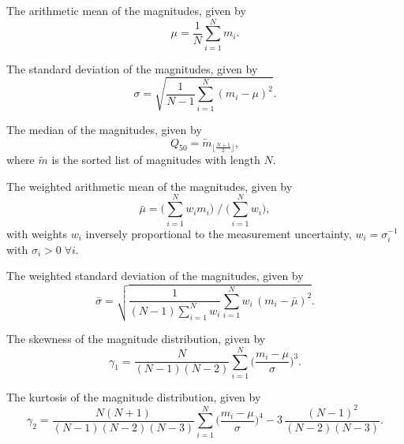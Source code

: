 \begin{enumerate}

 The arithmetic mean of the magnitudes, given by
\begin{equation}\mu = \frac{1}{N} \sum\limits_{i=1}^{N} m_i.\end{equation}

 The standard deviation of the magnitudes, given by
\begin{equation}\sigma = \sqrt{\frac{1}{N-1} \sum_{i=1}^N (m_i - \mu)^2}.\end{equation}

 The median of the magnitudes, given by
\begin{equation}Q_{50} = \tilde m_{\lfloor\frac{N+1}{2}\rfloor},\end{equation}
where $\tilde m$ is the sorted list of magnitudes with length $N$.

 The weighted arithmetic mean of the magnitudes, given by
\begin{equation}\bar \mu = \big(\sum\limits_{i=1}^{N} w_i m_i\big) \; / \; \big(\sum\limits_{i=1}^{N} w_i\big),\end{equation}
with weights $w_i$ inversely proportional to the measurement uncertainty, \ie $w_i = \sigma_i^{-1}$ with $\sigma_i > 0 \; \forall i$.

 The weighted standard deviation of the magnitudes, given by
\begin{equation}\bar \sigma = \sqrt{\frac{1}{(N-1) \sum\limits_{i=1}^{N} w_i} \sum_{i=1}^N w_i \, ( m_i - \bar \mu)^2}.\end{equation}

 The skewness of the magnitude distribution, given by
\begin{equation}\gamma_1 = \frac{N}{(N-1)(N-2)} \sum\limits_{i=1}^N \big( \frac{m_i - \mu}{\sigma} \big)^3.\end{equation}

 The kurtosis of the magnitude distribution, given by
\begin{equation}\gamma_2 = \frac{N(N+1)}{(N-1)(N-2)(N-3)} \sum\limits_{i=1}^N \big( \frac{m_i - \mu}{\sigma} \big)^4 - 3 \, \frac{(N-1)^2}{(N-2)(N-3)}.\end{equation}


\end{enumerate}
